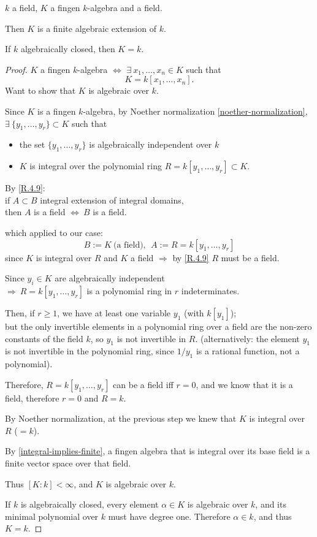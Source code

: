 \documentclass{article}
\theoremstyle{definition}
\newenvironment{lemma}[1]
{\renewcommand\theinnerlemma{#1}\innerlemma}
{\endinnerlemma}
\begin{document}
\begin{lemma}{}[Zariski's lemma]
  $k$ a field, $K$ a fingen $k$-algebra and a field.

  Then $K$ is a finite algebraic extension of $k$.

  If $k$ algebraically closed, then $K=k$.
\end{lemma}
\begin{proof}
  $K$ a fingen $k$-algebra $\Longleftrightarrow$ $\exists~ x_1,\ldots,x_n\in K$ such that
  $$K=k[x_1,\ldots,x_n].$$
  Want to show that $K$ is algebraic over $k$.

  Since $K$ is a fingen $k$-algebra, by Noether normalization \ref{noether-normalization},\\
  $\exists~ \{y_1, \ldots, y_r\} \subset K$ such that
  \begin{itemize}
    \item the set $\{y_1, \ldots, y_r\}$ is algebraically independent over $k$
    \item $K$ is integral over the polynomial ring $R=k[y_1, \ldots, y_r] \subset K$.
  \end{itemize}

  By \ref{R.4.9}:\\
  if $A \subset B$ integral extension of integral domains,\\
  then $A$ is a field $\Longleftrightarrow~ B$ is a field.

  which applied to our case:
  $$B:=K ~\text{(a field)},~~ A:= R=k[y_1, \ldots, y_r]$$
  since $K$ is integral over $R$ and $K$ a field $\Longrightarrow$ by \ref{R.4.9} $R$ must be a field.

  \vspace{0.3cm}
  Since $y_i \in K$ are algebraically independent\\
  $\Longrightarrow~ R=k[y_1, \ldots, y_r]$ is a polynomial ring in $r$ indeterminates.

  Then, if $r \geq 1$, we have at least one variable $y_1$ (with $k[y_1]$);\\
  but the only invertible elements in a polynomial ring over a field are the non-zero constants of the field $k$, so $y_1$ is not invertible in $R$.
  (alternatively: the element $y_1$ is not invertible in the polynomial ring, since $1/y_1$ is a rational function, not a polynomial).

  Therefore, $R=k[y_1, \ldots, y_r]$ can be a field iff $r=0$, and we know that it is a field, therefore $r=0$ and $R=k$.

  By Noether normalization, at the previous step we knew that $K$ is integral over $R$ ($=k$).

  \vspace{0.3cm}
  By \ref{integral-implies-finite}, a fingen algebra that is integral over its base field is a finite vector space over that field.

  Thus $[K:k]<\infty$, and $K$ is algebraic over $k$.

  If $k$ is algebraically closed, every element $\alpha\in K$ is algebraic over $k$, and its minimal polynomial over $k$ must have degree one. Therefore $\alpha\in k$, and thus $K=k$.
\end{proof}
\end{document}
